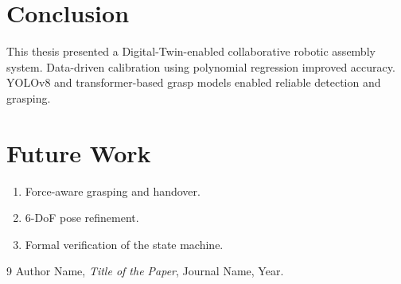 \documentclass[15pt, a4paper]{extreport}
\begin{document}
\section{Conclusion}
This thesis presented a Digital-Twin-enabled collaborative robotic assembly system. Data-driven calibration using polynomial regression improved accuracy. YOLOv8 and transformer-based grasp models enabled reliable detection and grasping.

\section{Future Work}
\begin{enumerate}
    \item Force-aware grasping and handover.
    \item 6-DoF pose refinement.
    \item Formal verification of the state machine.
\end{enumerate}

\begin{thebibliography}{9}
    Author Name, \textit{Title of the Paper}, Journal Name, Year.
\end{thebibliography}
\end{document}
